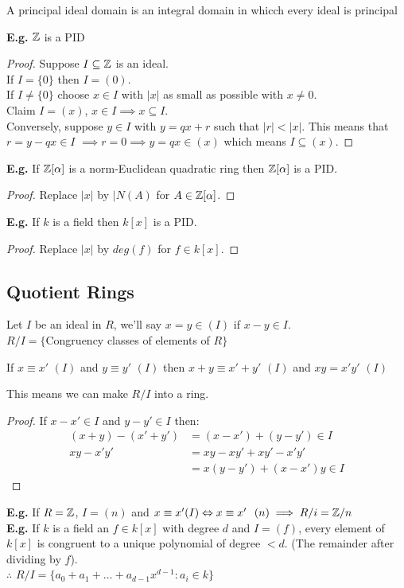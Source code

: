 \documentclass[11pt]{article}
\begin{document}
\begin{defn}
A principal ideal domain is an integral domain in whicch every ideal is principal
\end{defn}

\textbf{E.g.} $\mathbb{Z}$ is a PID 

\begin{proof}
	Suppose $I \subseteq \mathbb{Z} $ is an ideal.\\[0.5em]
	If $I=\{0\} $ then $I=(0)$.\\
	If $I \neq \{0\}$ choose $x \in I$ with $|x|$ as small as possible with $x\neq 0 $.\\[1em]
	Claim $I=(x) $, $x \in I \implies x \subseteq I$.\\[1em]
Conversely, suppose $y \in I$ with $ y = qx + r$ such that $|r| < |x| $.
	This means that $r = y-qx \in I$ $\implies r = 0 \implies y= qx \in (x) $ which means $I\subseteq (x)$.
\end{proof}
$ $\\[0em]

\textbf{E.g.} If $\mathbb{Z}[\alpha]$ is a norm-Euclidean quadratic ring then $\mathbb{Z}[\alpha]$ is a PID.
\begin{proof}
	Replace $|x|$ by $|N(A)$ for $A \in \mathbb{Z}[\alpha]$.
\end{proof}

 \textbf{E.g.} If $k$ is a field then $k[x]$ is a PID.
\begin{proof}
	Replace $|x|$ by $deg(f)$ for $f \in k[x]$.
\end{proof}
\subsection{Quotient Rings}
Let $I$ be an ideal in $R$, we'll say $x=y \in (I)$ if $x-y \in I$.
$ $\\[1em]
$R/I = \{$Congruency classes of elements of $R$$\}$

\begin{lemma}
	If $x \equiv x'$ $(I)$ and $y \equiv y'$ $(I)$ then $x+y  \equiv x'+y'$ $(I)$ and $xy = x'y'$ $(I)$
\end{lemma}
This means we can make $R/I$ into a ring.

\begin{proof}
If $x-x' \in I$ and $y-y' \in I$ then:
	\begin{align*}
		(x+y) - (x'+y')  &= (x-x') + (y-y') \in I \\[2em]
		xy - x'y' &= xy - xy' + xy' -x'y'\\
		&= x(y-y') + (x-x')y \in I
	\end{align*}
\end{proof}
$ $\\[-2em]
\textbf{E.g.} If $R = \mathbb{Z} $, $ I= (n) $ and  $x \equiv x' (I) \Leftrightarrow  x \equiv x' \hspace{7pt}(n) \implies R/i = \mathbb{Z}/n $ 
\\[1em]
\textbf{E.g.} If $k$ is a field an $f \in k[x]$ with degree $d$ and $I = (f)$, every element of $k[x]$ is congruent to a unique polynomial of degree $<d$. (The remainder after dividing by $f$).
$ $\\ 
$\therefore$  $R/I = \{ a_0 + a_1 + \dots + a_{d-1}x^{d-1} : a_i \in k \}$
\end{document}
